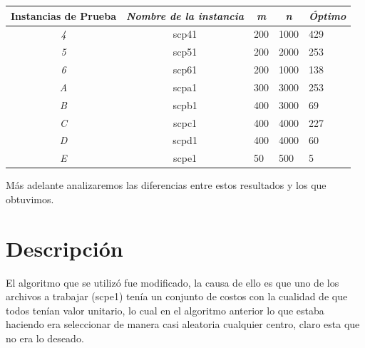 \documentclass[12pt,a4paper]{article}
\begin{document}
\begin{table}[h!]
\centering
\begin{tabular}{|c|c|l|l|l|}
\hline
\multicolumn{1}{|l|}{\textbf{Instancias de Prueba}} & \multicolumn{1}{l|}{\textit{Nombre de la instancia}} & \multicolumn{1}{c|}{\textit{m}} & \multicolumn{1}{c|}{\textit{n}} & \textit{Óptimo} \\ \hline
\textit{4}                                          & scp41                                                & 200                             & 1000                            & 429             \\ \hline
\textit{5}                                          & scp51                                                & 200                             & 2000                            & 253             \\ \hline
\textit{6}                                          & scp61                                                & 200                             & 1000                            & 138             \\ \hline
\textit{A}                                          & scpa1                                                & 300                             & 3000                            & 253             \\ \hline
\textit{B}                                          & scpb1                                                & 400                             & 3000                            & 69              \\ \hline
\textit{C}                                          & scpc1                                                & 400                             & 4000                            & 227             \\ \hline
\textit{D}                                          & scpd1                                                & 400                             & 4000                            & 60              \\ \hline
\textit{E}                                          & scpe1                                                & 50                              & 500                             & 5               \\ \hline
\end{tabular}
\end{table}

Más adelante analizaremos las diferencias entre estos resultados y los que obtuvimos.
\newpage
\section{Descripción}
 El algoritmo que se utilizó fue modificado, la causa de ello es que uno de los archivos a trabajar (scpe1) tenía un conjunto de costos con la cualidad de que todos tenían valor unitario, lo cual en el algoritmo anterior lo que estaba haciendo era seleccionar de manera casi aleatoria cualquier centro, claro esta que no era lo deseado.
\end{document}
